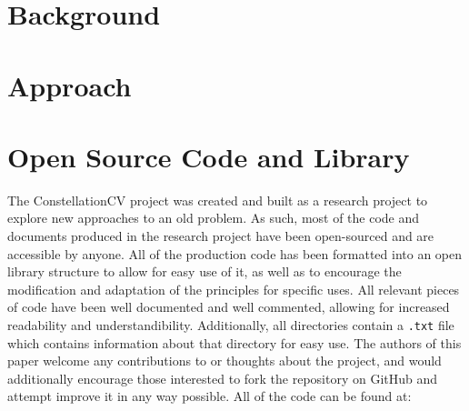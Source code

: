 \documentclass[preprint,12pt]{elsarticle}
\begin{document}
\section{Background}
\label{S:2}




\section{Approach}
\label{S:3}


%

%

%

\appendix

\nocite{*}

\newcommand{\nocontentsline}[3]{}
\newcommand{\tocless}[2]{\bgroup\let\addcontentsline=\nocontentsline#1{#2}\egroup}

\pagebreak

\tocless\section{Open Source Code and Library}
\label{A:1}
The ConstellationCV project was created and built as a research project to explore new approaches to an old problem. As such, most of the code
and documents produced in the research project have been open-sourced and are accessible by anyone. All of the production code has been formatted into an open library structure to allow for easy use of it, as well as to encourage the modification and adaptation of the principles for specific uses. All relevant pieces of code have been well documented and well commented, allowing for increased readability and understandibility. Additionally, all directories contain a \texttt{.txt} file which contains information about that directory for easy use. The authors of this paper welcome any contributions to or thoughts about the project, and would additionally encourage those interested to fork the repository on GitHub and attempt improve it in any way possible. All of the code can be found at:\\
\end{document}

